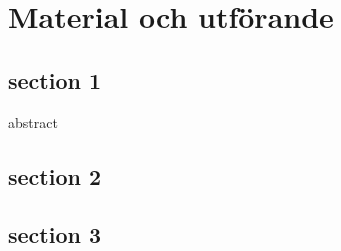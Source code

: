 \chapter{Material och utförande}

\section{section 1}
abstract
\section{section 2}

\section{section 3}